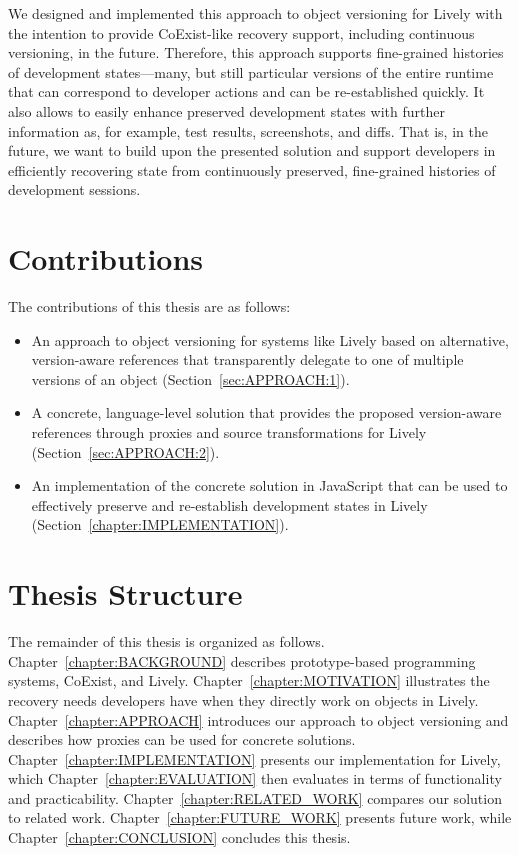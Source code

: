 We designed and implemented this approach to object versioning for Lively with the intention to provide CoExist-like recovery support, including continuous versioning, in the future.
Therefore, this approach supports fine-grained histories of development states---many, but still particular versions of the entire runtime that can correspond to developer actions and can be re-established quickly.
It also allows to easily enhance preserved development states with further information as, for example, test results, screenshots, and diffs.
That is, in the future, we want to build upon the presented solution and support developers in efficiently recovering state from continuously preserved, fine-grained histories of development sessions.\\


\section{Contributions}


The contributions of this thesis are as follows:
\begin{itemize}
    \item An approach to object versioning for systems like Lively based on alternative, version-aware references that transparently delegate to one of multiple versions of an object (Section~\ref{sec:APPROACH:1}).
    \item A concrete, language-level solution that provides the proposed version-aware references through proxies and source transformations for Lively (Section~\ref{sec:APPROACH:2}).
    \item An implementation of the concrete solution in JavaScript that can be used to effectively preserve and re-establish development states in Lively (Section~\ref{chapter:IMPLEMENTATION}).\\
\end{itemize}


\section{Thesis Structure}

The remainder of this thesis is organized as follows. 
Chapter~\ref{chapter:BACKGROUND} describes prototype-based programming systems, CoExist, and Lively.
Chapter~\ref{chapter:MOTIVATION} illustrates the recovery needs developers have when they directly work on objects in Lively.
Chapter~\ref{chapter:APPROACH} introduces our approach to object versioning and describes how proxies can be used for concrete solutions.
Chapter~\ref{chapter:IMPLEMENTATION} presents our implementation for Lively, which Chapter~\ref{chapter:EVALUATION} then evaluates in terms of functionality and practicability.
Chapter~\ref{chapter:RELATED_WORK} compares our solution to related work.
Chapter~\ref{chapter:FUTURE_WORK} presents future work, while Chapter~\ref{chapter:CONCLUSION} concludes this thesis.

